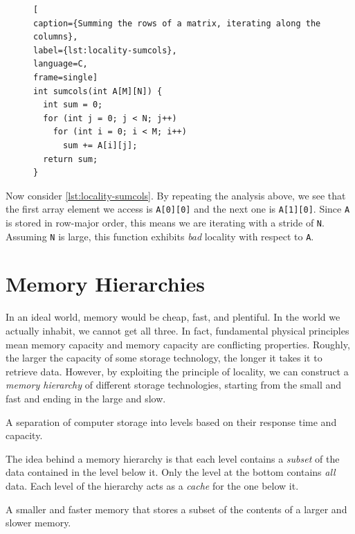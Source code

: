 \begin{figure}
\begin{lstlisting}[
caption={Summing the rows of a matrix, iterating along the columns},
label={lst:locality-sumcols},
language=C,
frame=single]
int sumcols(int A[M][N]) {
  int sum = 0;
  for (int j = 0; j < N; j++)
    for (int i = 0; i < M; i++)
      sum += A[i][j];
  return sum;
}
\end{lstlisting}
\end{figure}

Now consider \cref{lst:locality-sumcols}.  By repeating the analysis
above, we see that the first array element we access is
\texttt{A[0][0]} and the next one is \texttt{A[1][0]}.  Since
\texttt{A} is stored in row-major order, this means we are iterating
with a stride of \texttt{N}.  Assuming \texttt{N} is large, this
function exhibits \emph{bad} locality with respect to \texttt{A}.

\section{Memory Hierarchies}

In an ideal world, memory would be cheap, fast, and plentiful.  In the
world we actually inhabit, we cannot get all three.  In fact,
fundamental physical principles mean memory capacity and memory
capacity are conflicting properties.  Roughly, the larger the capacity
of some storage technology, the longer it takes it to retrieve data.
However, by exploiting the principle of locality, we can construct a
\emph{memory hierarchy} of different storage technologies, starting
from the small and fast and ending in the large and slow.

\begin{definition}
  A separation of computer storage into levels based on their response
  time and capacity.
\end{definition}

The idea behind a memory hierarchy is that each level contains a
\emph{subset} of the data contained in the level below it.  Only the
level at the bottom contains \emph{all} data.  Each level of the
hierarchy acts as a \emph{cache} for the one below it.

\begin{definition}[Cache]
  A smaller and faster memory that stores a subset of the contents of
  a larger and slower memory.
\end{definition}



